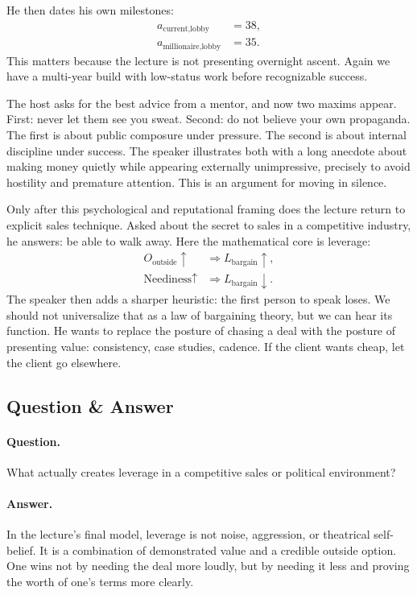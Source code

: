 He then dates his own milestones:
\begin{align}
a_{\text{current,lobby}} &= 38,\\
a_{\text{millionaire,lobby}} &= 35.
\end{align}
This matters because the lecture is not presenting overnight ascent. Again we have a multi-year build with low-status work before recognizable success.

The host asks for the best advice from a mentor, and now two maxims appear. First: never let them see you sweat. Second: do not believe your own propaganda. The first is about public composure under pressure. The second is about internal discipline under success. The speaker illustrates both with a long anecdote about making money quietly while appearing externally unimpressive, precisely to avoid hostility and premature attention. This is an argument for moving in silence.

Only after this psychological and reputational framing does the lecture return to explicit sales technique. Asked about the secret to sales in a competitive industry, he answers: be able to walk away. Here the mathematical core is leverage:
\begin{align}
O_{\text{outside}} \uparrow &\Rightarrow L_{\text{bargain}} \uparrow,\\
\text{Neediness} \uparrow &\Rightarrow L_{\text{bargain}} \downarrow.
\end{align}
The speaker then adds a sharper heuristic: the first person to speak loses. We should not universalize that as a law of bargaining theory, but we can hear its function. He wants to replace the posture of chasing a deal with the posture of presenting value: consistency, case studies, cadence. If the client wants cheap, let the client go elsewhere.

\subsection{Question \& Answer}

\paragraph{Question.} What actually creates leverage in a competitive sales or political environment?

\paragraph{Answer.} In the lecture's final model, leverage is not noise, aggression, or theatrical self-belief. It is a combination of demonstrated value and a credible outside option. One wins not by needing the deal more loudly, but by needing it less and proving the worth of one's terms more clearly.

